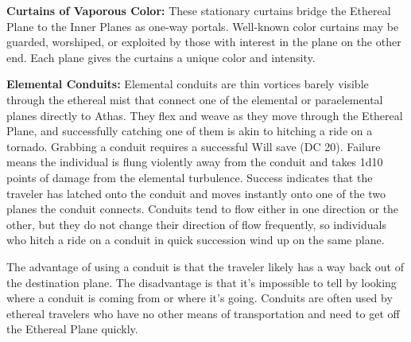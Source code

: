 \textbf{Curtains of Vaporous Color:} These stationary curtains bridge the Ethereal Plane to the Inner Planes as one-way portals. Well-known color curtains may be guarded, worshiped, or exploited by those with interest in the plane on the other end. Each plane gives the curtains a unique color and intensity.


\textbf{Elemental Conduits:} Elemental conduits are thin vortices barely visible through the ethereal mist that connect one of the elemental or paraelemental planes directly to Athas. They flex and weave as they move through the Ethereal Plane, and successfully catching one of them is akin to hitching a ride on a tornado. Grabbing a conduit requires a successful Will save (DC 20). Failure means the individual is flung violently away from the conduit and takes 1d10 points of damage from the elemental turbulence. Success indicates that the traveler has latched onto the conduit and moves instantly onto one of the two planes the conduit connects. Conduits tend to flow either in one direction or the other, but they do not change their direction of flow frequently, so individuals who hitch a ride on a conduit in quick succession wind up on the same plane.

The advantage of using a conduit is that the traveler likely has a way back out of the destination plane. The disadvantage is that it's impossible to tell by looking where a conduit is coming from or where it's going. Conduits are often used by ethereal travelers who have no other means of transportation and need to get off the Ethereal Plane quickly.

